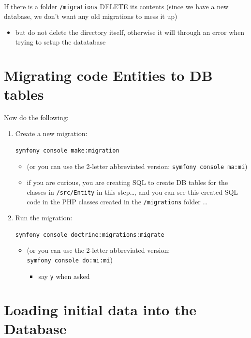 \documentclass[a4paperpaper,openright]{book}
\providecommand{\tightlist}{%
  \setlength{\itemsep}{0pt}\setlength{\parskip}{0pt}}
\begin{document}
If there is a folder \texttt{/migrations} DELETE its contents (since we
have a new database, we don't want any old migrations to mess it up)

\begin{itemize}
\tightlist
\item
  but do not delete the directory itself, otherwise it will through an
  error when trying to setup the datatabase
\end{itemize}

\hypertarget{migrating-code-entities-to-db-tables}{%
\section{Migrating code Entities to DB
tables}\label{migrating-code-entities-to-db-tables}}

Now do the following:

\begin{enumerate}
\def\labelenumi{\arabic{enumi}.}
\item
  Create a new migration:

  \texttt{symfony\ console\ make:migration}

  \begin{itemize}
  \item
    (or you can use the 2-letter abbreviated version:
    \texttt{symfony\ console\ ma:mi})
  \item
    if you are curious, you are creating SQL to create DB tables for the
    classes in \texttt{/src/Entity} in this step\ldots{}, and you can
    see this created SQL code in the PHP classes created in the
    \texttt{/migrations} folder \ldots{}
  \end{itemize}
\item
  Run the migration:

  \texttt{symfony\ console\ doctrine:migrations:migrate}

  \begin{itemize}
  \item
    (or you can use the 2-letter abbreviated version:
    \texttt{symfony\ console\ do:mi:mi})

    \begin{itemize}
    \tightlist
    \item
      say \texttt{y} when asked
    \end{itemize}
  \end{itemize}
\end{enumerate}

\hypertarget{loading-initial-data-into-the-database}{%
\section{Loading initial data into the
Database}\label{loading-initial-data-into-the-database}}
\end{document}
